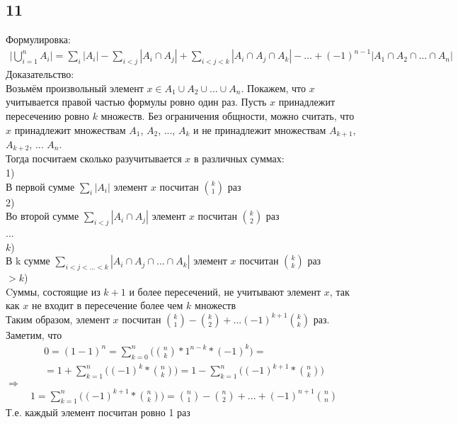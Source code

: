 		\subsection{11}
		Формулировка:
		\begin{gather*}
		\biggl | \bigcup_{i=1}^{n}A_i \biggl | = \sum_{i} | A_i | - \sum_{i<j} | A_i \cap A_j | + \sum_{i<j<k} | A_i \cap A_j \cap A_k | - \ldots + (-1)^{n-1} | A_1 \cap A_2 \cap \ldots \cap A_n |
		\end{gather*}
		Доказательство:\\
		Возьмём произвольный элемент $x \in A_1 \cup A_2 \cup ... \cup A_n$. Покажем, что $x$ учитывается правой частью формулы ровно один раз. Пусть $x$ принадлежит пересечению ровно $k$ множеств. Без ограничения общности, можно считать, что $x$ принадлежит множествам $A_1$, $A_2$, ..., $A_k$ и не принадлежит множествам $A_{k+1}$, $A_{k+2}$, ... $A_n$. \\
		Тогда посчитаем сколько разучитывается $x$ в различных суммах:\\
		1)\\
		В первой сумме $\sum_{i}^{}|A_i|$ элемент $x$ посчитан ${k \choose 1}$ раз
		\\
		2)\\
		Во второй сумме $\sum_{i<j} | A_i \cap A_j |$ элемент $x$ посчитан ${k \choose 2}$ раз
		\\
		...
		\\
		$k$)\\
		В k сумме $\sum_{i<j< ... <k} | A_i \cap A_j \cap ... \cap A_k|$ элемент $x$ посчитан ${k \choose k}$ раз
		\\
		$>k$)\\
		Cуммы, состоящие из $k + 1$ и более пересечений, не учитывают элемент $x$, так как $x$ не
		входит в пересечение более чем $k$ множеств
		\\
		Таким образом, элемент $x$ посчитан ${k \choose 1} - {k \choose 2} + ... (-1)^{k+1}{k \choose k}$ раз.\\		
		Заметим, что\\
		\begin{gather*}
		0 = (1-1)^n = \sum_{k = 0}^{n}\biggl({n \choose k} * 1^{n-k} * (-1)^k\biggl) = \\ =
		1 + \sum_{k = 1}^{n}\biggl((-1)^k * {n \choose k}\biggl) = 1 - \sum_{k = 1}^{n}\biggl((-1)^{k+1} * {n \choose k}\biggl)
		\end{gather*}
		$\Longrightarrow$
		\begin{gather*}
		1 = \sum_{k = 1}^{n}\biggl((-1)^{k+1} * {n \choose k}\biggl) = {n \choose 1} - {n \choose 2} + ... + (-1)^{n+1}{n \choose n}
		\end{gather*}
		Т.е. каждый элемент посчитан ровно 1 раз
		
